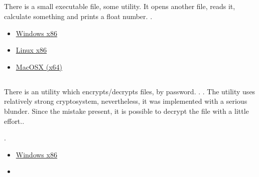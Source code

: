 \subsection{}

{There is a small executable file, some utility}.
{It opens another file, reads it, calculate something and prints a float number}.
.

\begin{itemize}
\item
\href{http://yurichev.com/RE-exercises/3/3/unknown_utility_2_3.exe}{Windows x86}

\item
\href{http://yurichev.com/RE-exercises/3/3/unknown_utility_2_3_Linux86.tar}{Linux x86}

\item
\href{http://yurichev.com/RE-exercises/3/3/unknown_utility_2_3_MacOSX.tar}{MacOSX (x64)}
\end{itemize}

\subsection{}

{There is an utility which encrypts/decrypts files, by password}.
.
.
{The utility uses relatively strong cryptosystem, nevertheless, it was implemented with a serious blunder.
Since the mistake present, it is possible to decrypt the file with a little effort.}.

.

\begin{itemize}
\item
\href{http://yurichev.com/RE-exercises/3/4/amateur_cryptor.exe}{Windows x86}

\item
\href{http://yurichev.com/RE-exercises/3/4/text_encrypted}{}
\end{itemize}

